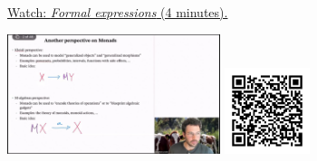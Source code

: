 
\begin{minipage}{10cm}
    \href{https://act4e-spring21.netlify.app/videos/spring2021-monads-b:formal-expressions.html}{Watch: \emph{Formal expressions} (4 minutes).}
        
    \href{https://act4e-spring21.netlify.app/videos/spring2021-monads-b:formal-expressions.html}{\includegraphics[height=3.5cm]{spring2021-monads-b:formal-expressions/thumbnails.jpg}}
    \href{https://act4e-spring21.netlify.app/videos/spring2021-monads-b:formal-expressions.html}{\includegraphics[height=2.5cm]{spring2021-monads-b:formal-expressions/qrcode.png}}
\end{minipage}
